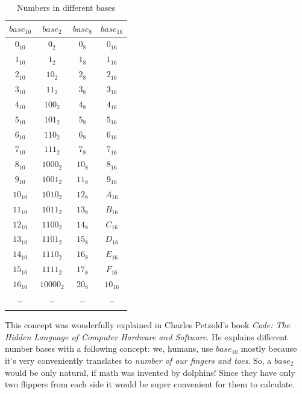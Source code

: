 \documentclass{article}
\begin{document}
            \begin{table}[H]
                \centering
                \begin{longtable}{|c|c|c|c|}
                    \hline
                    $base_{10}$ & $base_2$ & $base_8$ & $base_{16}$ \\\hline
                    $0_{10}$ & $0_2$ & $0_8$ & $0_{16}$ \\\hline
                    $1_{10}$ & $1_2$ & $1_8$ & $1_{16}$ \\\hline
                    $2_{10}$ & $10_2$ & $2_8$ & $2_{16}$ \\\hline
                    $3_{10}$ & $11_2$ & $3_8$ & $3_{16}$ \\\hline
                    $4_{10}$ & $100_2$ & $4_8$ & $4_{16}$ \\\hline
                    $5_{10}$ & $101_2$ & $5_8$ & $5_{16}$ \\\hline
                    $6_{10}$ & $110_2$ & $6_8$ & $6_{16}$ \\\hline
                    $7_{10}$ & $111_2$ & $7_8$ & $7_{16}$ \\\hline
                    $8_{10}$ & $1000_2$ & $10_8$ & $8_{16}$ \\\hline
                    $9_{10}$ & $1001_2$ & $11_8$ & $9_{16}$ \\\hline
                    $10_{10}$ & $1010_2$ & $12_8$ & $A_{16}$ \\\hline
                    $11_{10}$ & $1011_2$ & $13_8$ & $B_{16}$ \\\hline 
                    $12_{10}$ & $1100_2$ & $14_8$ & $C_{16}$ \\\hline
                    $13_{10}$ & $1101_2$ & $15_8$ & $D_{16}$ \\\hline
                    $14_{10}$ & $1110_2$ & $16_8$ & $E_{16}$ \\\hline
                    $15_{10}$ & $1111_2$ & $17_8$ & $F_{16}$ \\\hline
                    $16_{10}$ & $10000_2$ & $20_8$ & $10_{16}$ \\\hline 
                    \ldots & \ldots & \ldots & \ldots \\\hline
                    \caption{Numbers in different bases}

                \end{longtable}
            \end{table}


            This concept was wonderfully explained in Charles Petzold's book \emph{Code: The Hidden Language of Computer Hardware and Software}. He explains different
            number bases with a following concept: we, humans, use $base_{10}$ mostly because it's very conveniently translates to \emph{number of our fingers and toes}.
            So, a $base_2$ would be only natural, if math was invented by dolphins! Since they have only two flippers from each side it would be super convenient for
            them to calculate. \par
            
\end{document}
